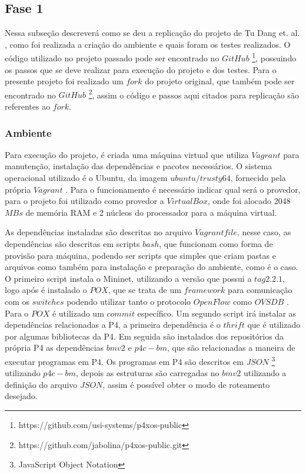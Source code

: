 \documentclass[12pt,
openright, 
oneside,
a4paper,
brazil]{facom-ufu-abntex2}
\theoremstyle{definition}
\begin{document}
\subsection{Fase 1}
Nessa subseção descreverá como se deu a replicação do projeto de Tu Dang et. al. 
\citep{dang2016paxos}, como foi realizada a criação do ambiente e quais foram os testes
realizados. O código utilizado no projeto passado pode ser encontrado no $GitHub$
\footnote{https://github.com/usi-systems/p4xos-public}, possuindo os passos que
se deve realizar para execução do projeto e dos testes. Para o presente projeto foi 
realizado um $fork$ do projeto original, que também pode ser encontrado no $GitHub$
\footnote{https://github.com/jabolina/p4xos-public.git}, assim o código e passos aqui
citados para replicação são referentes ao $fork$.

\subsubsection{Ambiente}
Para execução do projeto, é criada uma máquina virtual que utiliza $Vagrant$ para
manutenção, instalação das dependências e pacotes necessários. O sistema operacional
utilizado é o Ubuntu, da imagem $ubuntu/trusty64$, fornecido pela própria
$Vagrant$ \citep{ubuntuTrusty}. Para o funcionamento é necessário indicar qual será
o provedor, para o projeto foi utilizado como provedor a $VirtualBox$, onde foi
alocado 2048 $MBs$ de memória RAM e 2 núcleos do processador para a máquina
virtual.

As dependências instaladas são descritas no arquivo $Vagrantfile$, nesse caso,
as dependências são descritas em scripts $bash$, que funcionam como forma
de provisão para máquina, podendo ser scripts que simples que criam pastas e arquivos
como também para instalação e preparação do ambiente, como é o caso. O primeiro script 
instala o Mininet, utilizando a versão que possui a $tag 2.2.1$, logo após é instalado 
o $POX$, que se trata de um $framework$ para comunicação com os $switches$ podendo 
utilizar tanto o protocolo $OpenFlow$  como $OVSDB$ \citep{poxWiki}. Para o $POX$ 
é utilizado um $commit$ específico. Um segundo script irá instalar as dependências 
relacionadas a P4, a primeira dependência é o $thrift$ que é utilizado por
algumas bibliotecas da P4. Em seguida são instalados dos repositórios da própria P4
as dependências $bmv2$ e $p4c-bm$, que são relacionadas a maneira de executar programas em P4.
Os programas em P4 são descritos em $JSON$ \footnote{JavaScript Object Notation} utilizando
$p4c-bm$, depois as estruturas são carregadas no $bmv2$ utilizando a definição do arquivo
$JSON$, assim é possível obter o modo de roteamento desejado.
\end{document}
